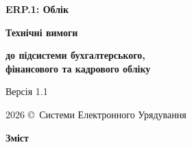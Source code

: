 \documentclass{article}
\newcommand\HUGE[1]{\fontsize{40}{40}\selectfont #1}
\begin{document}
\pagestyle{fancy}

\begin{titlepage}
  \AddToShipoutPictureBG*{\AtPageLowerLeft{\color{nato}\rule{\paperwidth}{\paperheight}}}
  \color{white}\thispagestyle{empty}\vspace*{4cm}\centering
  {\Huge  \textbf{ERP.1: Облік} \par} \vspace{1.5cm}
  {\HUGE  \textbf{Технічні вимоги} \par} \vspace{1.5cm}
  {\LARGE \textbf{до підсистеми бухгалтерського, \\ фінансового та кадрового обліку} \par} \vspace{1.5cm}
  {\large Версія 1.1 \par}
  \vfill
  {\large 2026 \copyright\ Системи Електронного Урядування \par}
\end{titlepage}

\newpage

\begin{center}
  {\Huge\color{nato}\bfseries Зміст\par}
\end{center}
\vspace{40pt}
\tableofcontents

\newpage
\end{document}

